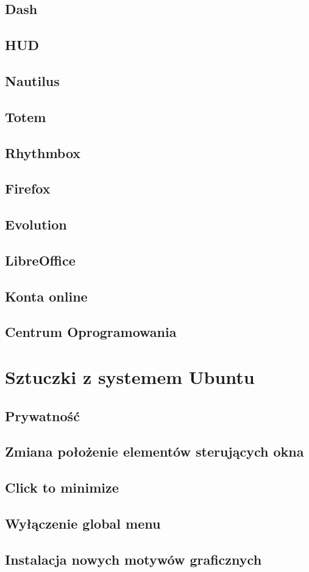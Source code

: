 \documentclass[a4paper,11pt,oneside]{mwart}
\begin{document}
	\subsection{Dash}
	\subsection{HUD}
	\subsection{Nautilus}
	\subsection{Totem}
	\subsection{Rhythmbox}
	\subsection{Firefox}
	\subsection{Evolution}
	\subsection{LibreOffice}
	\subsection{Konta online}
	\subsection{Centrum Oprogramowania}
\section{Sztuczki z systemem Ubuntu}
	\subsection{Prywatność}
	\subsection{Zmiana położenie elementów sterujących okna}
	\subsection{Click to minimize}
	\subsection{Wyłączenie global menu}
	\subsection{Instalacja nowych motywów graficznych}
	
\end{document}
